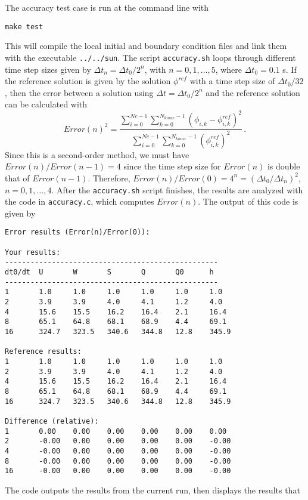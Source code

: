 The accuracy test case is run at the command line with
\begin{verbatim}
make test
\end{verbatim}
This will compile the local initial and boundary condition files and link them with the
executable \verb+../../sun+.  The script \verb+accuracy.sh+ loops through different
time step sizes given by $\Delta t_n = \Delta t_0/2^n$, with $n=0,1,\dots,5$, where
$\Delta t_0 = 0.1$ s.  If the reference solution is given by the solution $\phi^{ref}$
with a time step size of $\Delta t_0/32$, then the error between a solution using
$\Delta t=\Delta t_0/2^n$ and the 
reference solution can be calculated with
\[
Error(n)^2 = \frac{\sum_{i=0}^{Nc-1}\sum_{k=0}^{N_{kmax}-1} \left(\phi_{i,k}-\phi^{ref}_{i,k}\right)^2}
{\sum_{i=0}^{Nc-1}\sum_{k=0}^{N_{kmax}-1} \left(\phi^{ref}_{i,k}\right)^2}\,.
\]
Since this is a second-order method, we must have $Error(n)/Error(n-1)=4$ since the time step size
for $Error(n)$ is double that of $Error(n-1)$.  Therefore, $Error(n)/Error(0) = 4^n = (\Delta t_0/\Delta t_n)^2$,
$n=0,1,\dots,4$.  After
the \verb+accuracy.sh+ script finishes, the results are analyzed with the code in \verb+accuracy.c+,
which computes $Error(n)$.  The output of this code is given by
\begin{verbatim}
Error results (Error(n)/Error(0)):

Your results:
--------------------------------------------------
dt0/dt  U       W       S       Q       Q0      h
--------------------------------------------------
1       1.0     1.0     1.0     1.0     1.0     1.0
2       3.9     3.9     4.0     4.1     1.2     4.0
4       15.6    15.5    16.2    16.4    2.1     16.4
8       65.1    64.8    68.1    68.9    4.4     69.1
16      324.7   323.5   340.6   344.8   12.8    345.9

Reference results:
1       1.0     1.0     1.0     1.0     1.0     1.0
2       3.9     3.9     4.0     4.1     1.2     4.0
4       15.6    15.5    16.2    16.4    2.1     16.4
8       65.1    64.8    68.1    68.9    4.4     69.1
16      324.7   323.5   340.6   344.8   12.8    345.9

Difference (relative):
1       0.00    0.00    0.00    0.00    0.00    0.00
2       -0.00   0.00    0.00    0.00    0.00    -0.00
4       -0.00   0.00    0.00    0.00    0.00    -0.00
8       -0.00   0.00    0.00    0.00    0.00    -0.00
16      -0.00   0.00    0.00    0.00    0.00    -0.00
\end{verbatim}
The code outputs the results from the current run, then displays the results that
